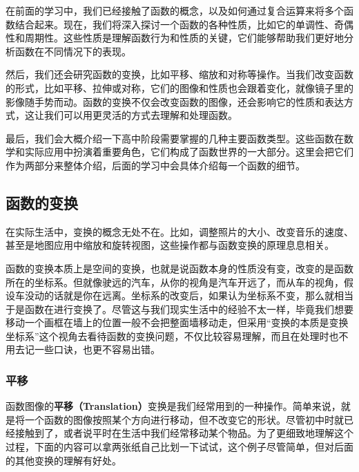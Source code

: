 
\begin{issues}
\issueDraft
\end{issues}


在前面的学习中，我们已经接触了函数的概念，以及如何通过复合运算来将多个函数结合起来。现在，我们将深入探讨一个函数的各种性质，比如它的单调性、奇偶性和周期性。这些性质是理解函数行为和性质的关键，它们能够帮助我们更好地分析函数在不同情况下的表现。

然后，我们还会研究函数的变换，比如平移、缩放和对称等操作。当我们改变函数的形式，比如平移、拉伸或对称，它们的图像和性质也会跟着变化，就像镜子里的影像随手势而动。函数的变换不仅会改变函数的图像，还会影响它的性质和表达方式，这让我们可以用更灵活的方式去理解和处理函数。

最后，我们会大概介绍一下高中阶段需要掌握的几种主要函数类型。这些函数在数学和实际应用中扮演着重要角色，它们构成了函数世界的一大部分。这里会把它们作为两部分来整体介绍，后面的学习中会具体介绍每一个函数的细节。

\subsection{函数的变换}

在实际生活中，变换的概念无处不在。比如，调整照片的大小、改变音乐的速度、甚至是地图应用中缩放和旋转视图，这些操作都与函数变换的原理息息相关。

函数的变换本质上是空间的变换，也就是说函数本身的性质没有变，改变的是函数所在的坐标系。但就像驶远的汽车，从你的视角是汽车开远了，而从车的视角，假设车没动的话就是你在远离。坐标系的改变后，如果认为坐标系不变，那么就相当于是函数在进行变换了。尽管这与我们现实生活中的经验不太一样，毕竟我们想要移动一个画框在墙上的位置一般不会把整面墙移动走，但采用“变换的本质是变换坐标系”这个视角去看待函数的变换问题，不仅比较容易理解，而且在处理时也不用去记一些口诀，也更不容易出错。

\subsubsection{平移}

函数图像的\textbf{平移（Translation）}变换是我们经常用到的一种操作。简单来说，就是将一个函数的图像按照某个方向进行移动，但不改变它的形状。尽管初中时就已经接触到了，或者说平时在生活中我们经常移动某个物品。为了更细致地理解这个过程，下面的内容可以拿两张纸自己比划一下试试，这个例子尽管简单，但对后面的其他变换的理解有好处。

